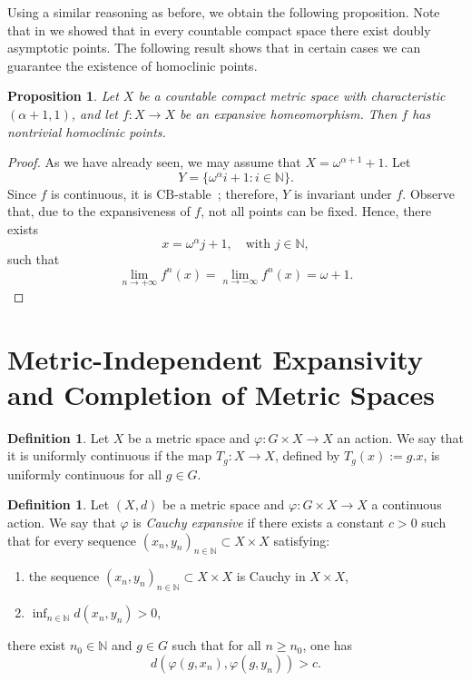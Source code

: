 \documentclass[12pt]{amsart}
\theoremstyle{plain}
\newtheorem{proposition}[theorem]{Proposition}
\theoremstyle{definition}
\newtheorem{definition}[theorem]{Definition}
\theoremstyle{remark}
\newcommand{\CBstable}{\ensuremath{\mathrm{CB\text{-}stable}}\ }
\begin{document}
Using a similar reasoning as before, we obtain the following proposition. Note that in \cite{Artigue2024} we showed that in every countable compact space there exist doubly asymptotic points. The following result shows that in certain cases we can guarantee the existence of homoclinic points.

\begin{proposition}
Let $X$ be a countable compact metric space with characteristic $(\alpha + 1,1)$, and let $f : X \rightarrow X$ be an expansive homeomorphism. Then $f$ has nontrivial homoclinic points.
\end{proposition}

\begin{proof}
As we have already seen, we may assume that $X = \omega^{\alpha + 1} + 1$. Let 
\[
Y = \lbrace \omega^{\alpha}i + 1 : i \in \mathbb{N} \rbrace.
\]
Since $f$ is continuous, it is \CBstable; therefore, $Y$ is invariant under $f$. Observe that, due to the expansiveness of $f$, not all points can be fixed. Hence, there exists 
\[
x = \omega^{\alpha}j + 1, \quad \text{with } j \in \mathbb{N},
\]
such that
\[
\lim_{n \rightarrow +\infty} f^n(x) = \lim_{n \rightarrow -\infty} f^n(x) = \omega + 1.
\]
\end{proof}



\section{Metric-Independent Expansivity and Completion of Metric Spaces}







\begin{definition}
Let \(X\) be a metric space and \(\varphi : G \times X \rightarrow X\) an action. We say that it is uniformly continuous if the map \(T_g : X \rightarrow X\), defined by \(T_g(x) := g.x\), is uniformly continuous for all $g \in G$.
\end{definition}






\begin{definition}
Let \((X,d)\) be a metric space and \(\varphi : G \times X \rightarrow X\) a continuous action. We say that \(\varphi\) is \emph{Cauchy expansive} if there exists a constant \(c > 0\) such that for every sequence \((x_n, y_n)_{n \in \mathbb{N}} \subset X \times X\) satisfying:
\begin{enumerate}
    \item the sequence \((x_n, y_n)_{n \in \mathbb{N}} \subset X \times X\) is Cauchy in \(X\times X\),
    \item \(\inf_{n \in \mathbb{N}} d(x_n, y_n) > 0\),
\end{enumerate}
there exist \(n_0 \in \mathbb{N}\) and \(g \in G\) such that for all \(n \geq n_0\), one has
\[
d(\varphi(g,x_n), \varphi(g,y_n)) > c.
\]
\end{definition}
\end{document}
